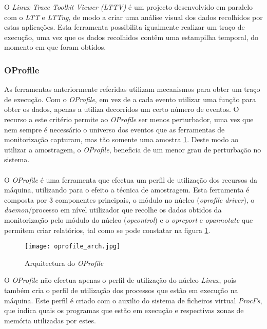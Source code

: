 O \textit{Linux Trace Toolkit Viewer (LTTV)} é um projecto desenvolvido em paralelo com o \textit{LTT} e \textit{LTTng}, de modo a criar uma análise visual dos dados recolhidos por estas aplicações.
Esta ferramenta possibilita igualmente realizar um traço de execução, uma vez que os dados recolhidos contêm uma estampilha temporal, do momento em que foram obtidos.
 
\subsubsection{OProfile}\label{cap:Oprofile_overview}
As ferramentas anteriormente referidas utilizam mecanismos para obter um traço de execução.
Com o \textit{OProfile}, em vez de a cada evento utilizar uma função para obter os dados, apenas a utiliza decorridos um certo número de eventos.
O recurso a este critério permite ao \textit{OProfile} ser menos perturbador, uma vez que nem sempre é necessário o universo dos eventos que as ferramentas de monitorização capturam, mas tão somente uma amostra \ref{fig:oprofile_arch}.
Deste modo ao utilizar a amostragem, o \textit{OProfile}, beneficia de um menor grau de perturbação no sistema\cite{Will:TuninProgrOProf}.

\paragraph*{}
O \textit{OProfile} é uma ferramenta que efectua um perfil de utilização dos recursos da máquina, utilizando para o efeito a técnica de amostragem.
Esta ferramenta é composta por 3 componentes principais, o módulo no núcleo (\textit{oprofile driver}), o \textit{daemon}/processo em nível utilizador que recolhe os dados obtidos da monitorização pelo módulo do núcleo (\textit{opcontrol}) e o \textit{opreport} e \textit{opannotate} que permitem criar relatórios, tal como se pode constatar na figura \ref{fig:oprofile_arch}.

\begin{figure}[!htb]
       \centering
       \texttt{[image: oprofile\_arch.jpg]}
       \caption{Arquitectura do \textit{OProfile} \cite{Will:TuninProgrOProf}}
	\label{fig:oprofile_arch}
\end{figure}

O \textit{OProfile} não efectua apenas o perfil de utilização do núcleo \textit{Linux}, pois também cria o perfil de utilização dos processos que estão em execução na máquina.
Este perfil é criado com o auxilio do sistema de ficheiros virtual \textit{ProcFs}, que indica quais os programas que estão em execução e respectivas zonas de memória utilizadas por estes.

